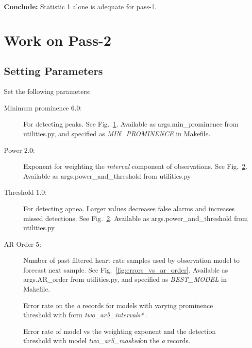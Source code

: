 \documentclass[12pt]{article}
\newcommand{\BestModel}{\emph{two\_ar5\_masked}}
\begin{document}
\textbf{Conclude:} Statistic 1 alone is adequate for pass-1.

\section{Work on Pass-2}
\label{sec:pass-2}

\subsection{Setting Parameters}
\label{sec:setting_parameters}

Set the following parameters:
\begin{description}
\item[Minimum prominence $6.0$:] For detecting peaks.  See
  Fig.~\ref{fig:prominence_study}.  Available as args.min\_prominence
  from utilities.py, and specified as \emph{MIN\_PROMINENCE} in Makefile.
\item[Power $2.0$:] Exponent for weighting the \emph{interval}
  component of observations.  See Fig.~\ref{fig:power_threshold}.
  Available as args.power\_and\_threshold from utilities.py
\item[Threshold $1.0$:] For detecting apnea.  Larger values decreases
  false alarms and increases missed detections.  See
  Fig.~\ref{fig:power_threshold}.  Available as
  args.power\_and\_threshold from utilities.py
\item[AR Order $5$:] Number of past filtered heart rate samples used
  by observation model to forecast next sample.  See
  Fig.~\ref{fig:errors_vs_ar_order}.  Available as args.AR\_order from
  utilities.py, and specified as \emph{BEST\_MODEL} in Makefile.
\end{description}

\begin{figure}
  \centering
    \caption{Error rate on the \emph{a} records for models with
      varying prominence threshold with form
      \emph{two\_ar5\_intervals*} .}
  \label{fig:prominence_study}
\end{figure}

\begin{figure}
  \centering
    \caption{Error rate of model vs the weighting exponent and the
      detection threshold with model \BestModel on the
      \emph{a} records.}
  \label{fig:power_threshold}
\end{figure}
\end{document}
